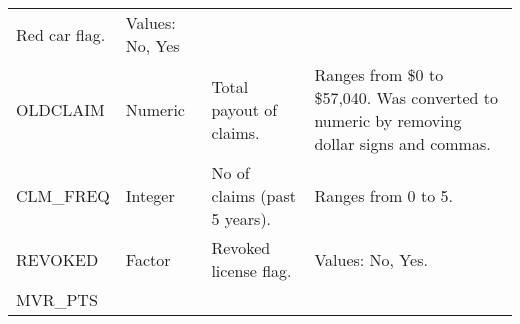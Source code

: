 \documentclass[]{article}
\begin{document}
\begin{longtable}[]{@{}llll@{}}
\begin{minipage}[t]{0.28\columnwidth}
Red car flag.\strut
\end{minipage} & \begin{minipage}[t]{0.28\columnwidth}\raggedright\strut
Values: No, Yes\strut
\end{minipage}\tabularnewline
\begin{minipage}[t]{0.16\columnwidth}\raggedright\strut
OLDCLAIM\strut
\end{minipage} & \begin{minipage}[t]{0.12\columnwidth}\raggedright\strut
Numeric\strut
\end{minipage} & \begin{minipage}[t]{0.28\columnwidth}\raggedright\strut
Total payout of claims.\strut
\end{minipage} & \begin{minipage}[t]{0.28\columnwidth}\raggedright\strut
Ranges from \$0 to \$57,040. Was converted to numeric by removing dollar
signs and commas.\strut
\end{minipage}\tabularnewline
\begin{minipage}[t]{0.16\columnwidth}\raggedright\strut
CLM\_FREQ\strut
\end{minipage} & \begin{minipage}[t]{0.12\columnwidth}\raggedright\strut
Integer\strut
\end{minipage} & \begin{minipage}[t]{0.28\columnwidth}\raggedright\strut
No of claims (past 5 years).\strut
\end{minipage} & \begin{minipage}[t]{0.28\columnwidth}\raggedright\strut
Ranges from 0 to 5.\strut
\end{minipage}\tabularnewline
\begin{minipage}[t]{0.16\columnwidth}\raggedright\strut
REVOKED\strut
\end{minipage} & \begin{minipage}[t]{0.12\columnwidth}\raggedright\strut
Factor\strut
\end{minipage} & \begin{minipage}[t]{0.28\columnwidth}\raggedright\strut
Revoked license flag.\strut
\end{minipage} & \begin{minipage}[t]{0.28\columnwidth}\raggedright\strut
Values: No, Yes.\strut
\end{minipage}\tabularnewline
\begin{minipage}[t]{0.16\columnwidth}\raggedright\strut
MVR\_PTS\strut
\end{minipage} & \begin{minipage}[t]{0.12\columnwidth}\raggedright\strut

\end{minipage}
\end{longtable}
\end{document}
